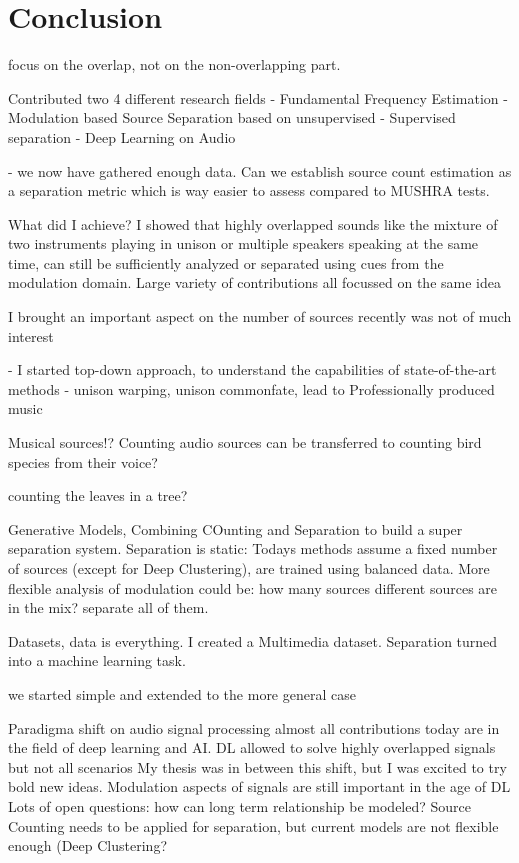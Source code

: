 \chapter{Conclusion}


focus on the overlap, not on the non-overlapping part.


Contributed two 4 different research fields
- Fundamental Frequency Estimation
- Modulation based Source Separation based on unsupervised
- Supervised separation
- Deep Learning on Audio

- we now have gathered enough data. Can we establish source count estimation as a separation metric which is way easier to assess compared to MUSHRA tests.

 What did I achieve?
I showed that highly overlapped sounds like the mixture of two instruments playing in unison or multiple speakers speaking at the same time, can still be sufficiently analyzed or separated using cues from the modulation domain. 
Large variety of contributions all focussed on the same idea

I brought an important aspect on the number of sources recently was not of much interest

- I started top-down approach, to understand the capabilities of state-of-the-art methods
- unison warping, unison commonfate, lead to Professionally produced music

Musical sources!?
Counting audio sources can be transferred to counting bird species from their voice?

counting the leaves in a tree?

Generative Models, 
Combining COunting and Separation to build a super separation system.
Separation is static: Todays methods assume a fixed number of sources (except for Deep Clustering), are trained using balanced data. More flexible analysis of modulation could be: how many sources different sources are in the mix? separate all of them.

Datasets, data is everything. I created a Multimedia dataset. 
Separation turned into a machine learning task.

we started simple and extended to the more general case

Paradigma shift on audio signal processing almost all contributions today are in the field of deep learning and AI.
DL allowed to solve highly overlapped signals but not all scenarios
My thesis was in between this shift, but I was excited to try bold new ideas. 
Modulation aspects of signals are still important in the age of DL
Lots of open questions: how can long term relationship be modeled?
Source Counting needs to be applied for separation, but current models are not flexible enough (Deep Clustering?


